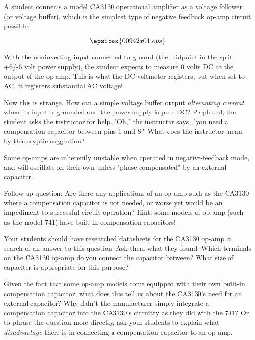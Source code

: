 

A student connects a model CA3130 operational amplifier as a voltage follower (or voltage buffer), which is the simplest type of negative feedback op-amp circuit possible:

$$\epsfbox{00942x01.eps}$$

With the noninverting input connected to ground (the midpoint in the split +6/-6 volt power supply), the student expects to measure 0 volts DC at the output of the op-amp.  This is what the DC voltmeter registers, but when set to AC, it registers substantial AC voltage!

Now this is strange.  How can a simple voltage buffer output {\it alternating current} when its input is grounded and the power supply is pure DC?  Perplexed, the student asks the instructor for help.  "Oh," the instructor says, "you need a compensation capacitor between pins 1 and 8."  What does the instructor mean by this cryptic suggestion?







Some op-amps are inherently unstable when operated in negative-feedback mode, and will oscillate on their own unless "phase-compensated" by an external capacitor.

\vskip 10pt

Follow-up question: Are there any applications of an op-amp such as the CA3130 where a compensation capacitor is not needed, or worse yet would be an impediment to successful circuit operation?  Hint: some models of op-amp (such as the model 741) have built-in compensation capacitors!







Your students should have researched datasheets for the CA3130 op-amp in search of an answer to this question.  Ask them what they found!  Which terminals on the CA3130 op-amp do you connect the capacitor between?  What size of capacitor is appropriate for this purpose?

Given the fact that some op-amp models come equipped with their own built-in compensation capacitor, what does this tell us about the CA3130's need for an external capacitor?  Why didn't the manufacturer simply integrate a compensation capacitor into the CA3130's circuitry as they did with the 741?  Or, to phrase the question more directly, ask your students to explain what {\it disadvantage} there is in connecting a compensation capacitor to an op-amp.




